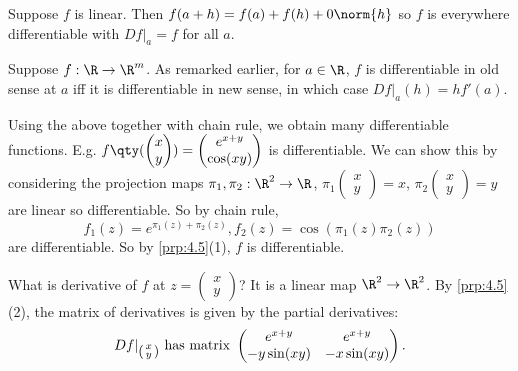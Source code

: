 \begin{example}
    Suppose $f$ is linear. Then $f(a+h) = f(a) + f(h) + 0\norm{h}$ so $f$ is everywhere differentiable with $Df|_a = f$ for all $a$.
\end{example}

\begin{example}
    Suppose $f: \R \to\R^m$. As remarked earlier, for $a\in \R$, $f$ is differentiable in old sense at $a$ iff it is differentiable in new sense, in which case $Df|_a(h) = hf'(a)$.
\end{example}

\begin{example}
Using the above together with chain rule, we obtain many differentiable functions. E.g. $f \qty(\begin{pmatrix} x\\ y \end{pmatrix}) = \begin{pmatrix} e^{x+y}\\ \cos(xy) \end{pmatrix}$ is differentiable. We can show this by considering the projection maps $\pi_1, \pi_2: \R^2\to \R$, $\pi_1\begin{pmatrix} x\\ y \end{pmatrix} = x$, $\pi_2 \begin{pmatrix} x\\ y \end{pmatrix} = y$ are linear so differentiable. So by chain rule, \[f_1(z) = e^{\pi_1(z) + \pi_2(z)}, f_2(z) = \cos(\pi_1(z)\pi_2(z)) \] are differentiable. So by \cref{prp:4.5}(1), $f$ is differentiable.

What is derivative of $f$ at $z = \begin{pmatrix} x\\ y \end{pmatrix}$? It is a linear map $\R^2 \to \R^2$. By \cref{prp:4.5}(2), the matrix of derivatives is given by the partial derivatives: \[ Df|_{\begin{psmallmatrix} x\\ y \end{psmallmatrix}} \textup{ has matrix } \begin{pmatrix} e^{x+y} & e^{x+y}\\ -y\sin(xy) & -x\sin(xy) \end{pmatrix}. \]
\end{example}

